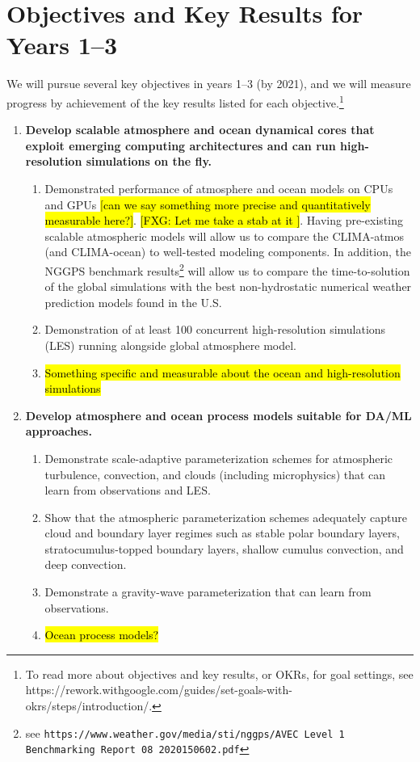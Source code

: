 \documentclass{article}
\begin{document}
\section{Objectives and Key Results for Years 1--3}

We will pursue several key objectives in years 1--3 (by 2021), and we will measure progress by achievement of the key results listed for each objective.\footnote{To read more about objectives and key results, or OKRs, for goal settings, see https://rework.withgoogle.com/guides/set-goals-with-okrs/steps/introduction/.}
\begin{enumerate}
    \item \textbf{Develop scalable atmosphere and ocean dynamical cores that exploit emerging computing architectures and can run high-resolution simulations on the fly.}
    \begin{enumerate}
        \item Demonstrated performance of atmosphere and ocean models on CPUs and GPUs \hl{[can we say something more precise and quantitatively measurable here?]}. \hl{[FXG: Let me take a stab at it ]}.  Having pre-existing scalable atmospheric models \cite{abdi:2016b,abdi:2018,mueller:2016} will allow us to compare the CLIMA-atmos (and CLIMA-ocean) to well-tested modeling components.  In addition, the NGGPS benchmark results\footnote{see \texttt{https://www.weather.gov/media/sti/nggps/AVEC Level 1 Benchmarking Report 08 2020150602.pdf}}
         will allow us to compare the time-to-solution of the global simulations with the best non-hydrostatic numerical weather prediction models found in the U.S.
        \item Demonstration of at least 100 concurrent high-resolution simulations (LES) running alongside global atmosphere model.
        \item \hl{Something specific and measurable about the ocean and high-resolution simulations}
    \end{enumerate}
    
    \item \textbf{Develop atmosphere and ocean process models suitable for DA/ML approaches.}
    \begin{enumerate}
        \item Demonstrate scale-adaptive parameterization schemes for atmospheric turbulence, convection, and clouds (including microphysics) that can learn from observations and LES.
        \item Show that the atmospheric parameterization schemes adequately capture cloud and boundary layer regimes such as stable polar boundary layers, stratocumulus-topped boundary layers, shallow cumulus convection, and deep convection.
        \item Demonstrate a gravity-wave parameterization that can learn from observations.
        \item \hl{Ocean process models?}
        

\end{enumerate}
\end{enumerate}
\end{document}
